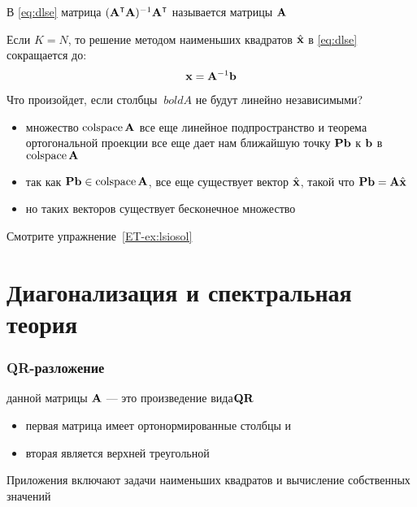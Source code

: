 \begin{frame}

    \vspace{2em}
    В \eqref{eq:dlse} матрица $(\boldA^\T\boldA)^{-1} \boldA^\T$ 
    называется  матрицы $\mathbf A$ 
    
    \vspace{1em}
    Если $K =
    N$, то
    решение методом наименьших квадратов $\hat {\mathbf x}$ в \eqref{eq:dlse} сокращается до:
    \begin{equation*}
        {\mathbf x} = \mathbf A^{-1}{\mathbf b}
    \end{equation*}
    
\end{frame}

\begin{frame}

     \vspace{2em}
    Что произойдет, если столбцы $ \ boldA $ не будут
    линейно независимыми? 
    
    \begin{itemize}
        \item   множество $\operatorname{colspace} \mathbf A$ все еще линейное
        подпространство и теорема ортогональной проекции все еще дает нам ближайшую
        точку $\mathbf P {\mathbf b}$ к ${\mathbf b}$ в $\operatorname{colspace} \mathbf A$
        \item   так как $\mathbf P
        {\mathbf b} \in \operatorname{colspace} \mathbf A$, все еще существует вектор $\hat {\mathbf x}$, такой что
        $\mathbf P {\mathbf b} = \mathbf A \hat {\mathbf x}$
        \item   но таких векторов существует бесконечное множество
    \end{itemize}
    
    Смотрите упражнение~\ref{ET-ex:lsiosol}
    
\end{frame}


\section{Диагонализация и спектральная теория} 

\begin{frame}\frametitle{QR-разложение}

     \vspace{2em}
     данной матрицы $\mathbf A$ --- это произведение вида$\mathbf Q \mathbf R$
    \begin{itemize}
        \item первая матрица имеет ортонормированные столбцы и 
        \item вторая является верхней треугольной
    \end{itemize}
    
    \vspace{1em}
    Приложения включают задачи наименьших квадратов и вычисление собственных значений
    
\end{frame}

